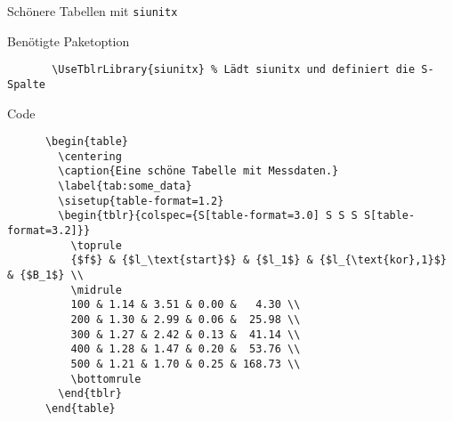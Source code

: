 \begin{frame}[fragile]{
  Schönere Tabellen mit \texttt{siunitx}
  \hfill
}
  \fontsize{8}{6}
  \begin{block}{Benötigte Paketoption}
    \begin{verbatim}
       \UseTblrLibrary{siunitx} % Lädt siunitx und definiert die S-Spalte
     \end{verbatim}
  \end{block}

  \begin{block}{Code}
    \begin{verbatim}
      \begin{table}
        \centering
        \caption{Eine schöne Tabelle mit Messdaten.}
        \label{tab:some_data}
        \sisetup{table-format=1.2}
        \begin{tblr}{colspec={S[table-format=3.0] S S S S[table-format=3.2]}}
          \toprule
          {$f$} & {$l_\text{start}$} & {$l_1$} & {$l_{\text{kor},1}$} & {$B_1$} \\
          \midrule
          100 & 1.14 & 3.51 & 0.00 &   4.30 \\
          200 & 1.30 & 2.99 & 0.06 &  25.98 \\
          300 & 1.27 & 2.42 & 0.13 &  41.14 \\
          400 & 1.28 & 1.47 & 0.20 &  53.76 \\
          500 & 1.21 & 1.70 & 0.25 & 168.73 \\
          \bottomrule
        \end{tblr}
      \end{table}
    \end{verbatim}
  \end{block}
\end{frame}

